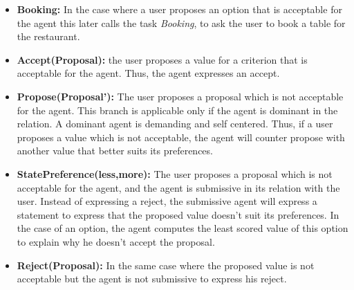 \documentclass{llncs}
\begin{document}
\begin{itemize}
	\item \textbf{Booking:} In the case where a user proposes an option that is acceptable for the agent this later calls the task \textit{Booking}, to ask the user to book a table for the restaurant. 
	\item \textbf{Accept(Proposal):} the user proposes a value for a criterion that is acceptable for the agent. Thus, the agent expresses an accept.
	\item \textbf{Propose(Proposal'):} The user proposes a proposal which is not acceptable for the agent. This branch is applicable only if the agent is dominant in the relation. A dominant agent is demanding and self centered. Thus, if a user proposes a value which is not acceptable, the agent will counter propose with another value that better suits its preferences.
	\item \textbf{StatePreference(less,more):} The user proposes a proposal which is not acceptable for the agent, and the agent is submissive in its relation with the user. Instead of expressing a reject, the submissive agent will express a statement to express that the proposed value doesn't suit its preferences.
	In the case of an option, the agent computes the least scored value of this option to explain why he doesn't accept the proposal.
	\item\textbf{Reject(Proposal):} In the same case where the proposed value is not acceptable but the agent is not submissive to express his reject.
		
\end{itemize}
\end{document}
